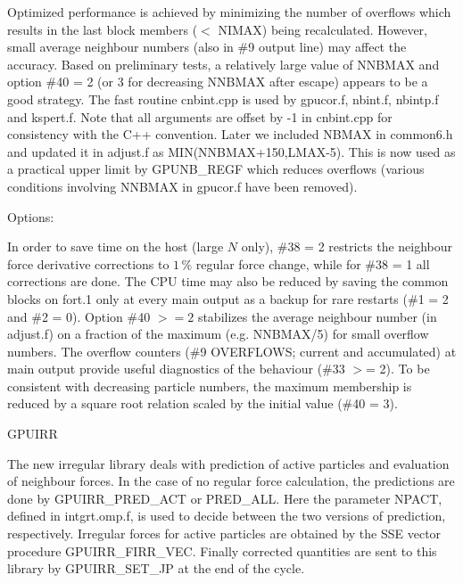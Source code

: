 \documentclass[12pt]{article}
\begin{document}
\medskip
Optimized performance is achieved by minimizing the number of overflows
which results in the last block members ($<$ NIMAX) being recalculated.
However, small average neighbour numbers (also in \#9 output line) may affect
the accuracy. Based on preliminary tests, a relatively large value of
NNBMAX and option \#40 = 2 (or 3 for decreasing NNBMAX after escape)
appears to be a good strategy.
The fast routine cnbint.cpp is used by gpucor.f, nbint.f, nbintp.f and kspert.f.
Note that all arguments are offset by -1 in cnbint.cpp for consistency with
the C++ convention.
Later we included NBMAX in common6.h and updated it in adjust.f as
MIN(NNBMAX+150,LMAX-5). This is now used as a practical upper limit by
GPUNB\_REGF which reduces overflows (various conditions involving
NNBMAX in gpucor.f have been removed).

\medskip
\medskip
\noindent
%

\medskip
\medskip
\noindent
Options:

\medskip
In order to save time on the host (large $N$ only), \#38 = 2 restricts the
neighbour force derivative corrections to $1 \,\%$ regular force change,
while for \#38 = 1 all corrections are done.
The CPU time may also be reduced by saving the common blocks on fort.1
only at every main output as a backup for rare restarts (\#1 = 2 and \#2 = 0).
Option \#40 $>= 2$ stabilizes the average neighbour number (in adjust.f)
on a fraction of the maximum (e.g. NNBMAX/5) for small overflow numbers.
The overflow counters (\#9 OVERFLOWS; current and accumulated) at main
output provide useful diagnostics of the behaviour (\#33 $>$= 2).
To be consistent with decreasing particle numbers, the maximum membership
is reduced by a square root relation scaled by the initial value (\#40 = 3).

\medskip
\medskip
\noindent
GPUIRR

\medskip
The new irregular library deals with prediction of active particles and
evaluation of neighbour forces.
In the case of no regular force calculation,
the predictions are done by GPUIRR\_PRED\_ACT or PRED\_ALL.
Here the parameter NPACT, defined in intgrt.omp.f, is used to decide between
the two versions of prediction, respectively.
Irregular forces for active particles are obtained by the SSE vector
procedure GPUIRR\_FIRR\_VEC.
Finally corrected quantities are sent to this library by GPUIRR\_SET\_JP
at the end of the cycle.
\end{document}
